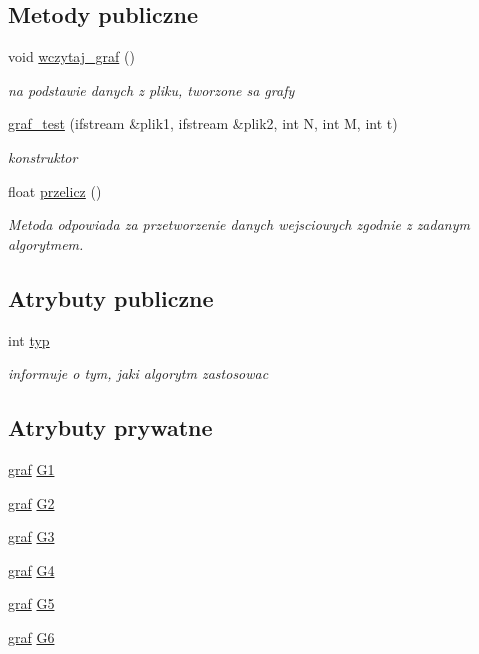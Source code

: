 \subsection*{Metody publiczne}
\begin{DoxyCompactItemize}
\item 
void \hyperlink{classgraf__test_aeff6fe08c72fe45a15bd7b41028acc7c}{wczytaj\-\_\-graf} ()
\begin{DoxyCompactList}\small\item\em na podstawie danych z pliku, tworzone sa grafy \end{DoxyCompactList}\item 
\hyperlink{classgraf__test_a918efb015a8a1c64f0bec75cf9464f73}{graf\-\_\-test} (ifstream \&plik1, ifstream \&plik2, int N, int M, int t)
\begin{DoxyCompactList}\small\item\em konstruktor \end{DoxyCompactList}\item 
float \hyperlink{classgraf__test_acd71a655b831470f5458b5d3d12eda00}{przelicz} ()
\begin{DoxyCompactList}\small\item\em Metoda odpowiada za przetworzenie danych wejsciowych zgodnie z zadanym algorytmem. \end{DoxyCompactList}\end{DoxyCompactItemize}
\subsection*{Atrybuty publiczne}
\begin{DoxyCompactItemize}
\item 
int \hyperlink{classgraf__test_a0d14d8d811514d102e082a2dc52a4813}{typ}
\begin{DoxyCompactList}\small\item\em informuje o tym, jaki algorytm zastosowac \end{DoxyCompactList}\end{DoxyCompactItemize}
\subsection*{Atrybuty prywatne}
\begin{DoxyCompactItemize}
\item 
\hyperlink{classgraf}{graf} \hyperlink{classgraf__test_ad381752b1793a26f024d7083acc686b7}{G1}
\item 
\hyperlink{classgraf}{graf} \hyperlink{classgraf__test_a2da908ecaa7b052598d842ffd6c366a9}{G2}
\item 
\hyperlink{classgraf}{graf} \hyperlink{classgraf__test_aaa19fc1426adf89a109e8679b92ee076}{G3}
\item 
\hyperlink{classgraf}{graf} \hyperlink{classgraf__test_acdda3ab9733fc4d62802fdf2f3872da5}{G4}
\item 
\hyperlink{classgraf}{graf} \hyperlink{classgraf__test_a1ed75824208bf907bf0c80de05046b49}{G5}
\item 
\hyperlink{classgraf}{graf} \hyperlink{classgraf__test_a01b58fa6f7b1a36c0239e65d9c6b87a0}{G6}
\end{DoxyCompactItemize}
